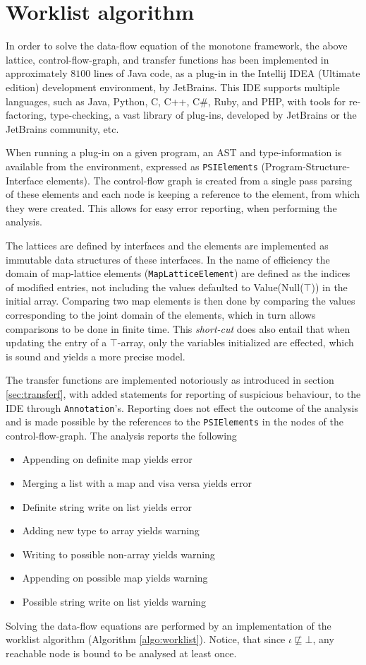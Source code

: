 \section{Worklist algorithm}
\label{sec:worklist}
In order to solve the data-flow equation of the monotone framework, the above lattice, control-flow-graph, and transfer functions has been implemented in approximately $8100$ lines of Java code, as a plug-in in the Intellij IDEA (Ultimate edition) development environment, by JetBrains. This IDE supports multiple languages, such as Java, Python, C, C++, C\#, Ruby, and PHP, with tools for re-factoring, type-checking, a vast library of plug-ins, developed by JetBrains or the JetBrains community, etc. 

When running a plug-in on a given program, an AST and type-information is available from the environment, expressed as \texttt{PSIElements} (Program-Structure-Interface elements).  The control-flow graph is created from a single pass parsing of these elements and each node is keeping a reference to the element, from which they were created. This allows for easy error reporting, when performing the analysis. 

The lattices are defined by interfaces and the elements are implemented as immutable data structures of these interfaces. In the name of efficiency the domain of map-lattice elements (\texttt{MapLatticeElement}) are defined as the indices of modified entries, not including the values defaulted to Value(Null($\top$)) in the initial array. Comparing two map elements is then done by comparing the values corresponding to the joint domain of the elements, which in turn allows comparisons to be done in finite time. This \emph{short-cut} does also entail that when updating the entry of a $\top$-array, only the variables initialized are effected, which is sound and yields a more precise model.

The transfer functions are implemented notoriously as introduced in section \ref{sec:transferf}, with added statements for reporting of suspicious behaviour, to the IDE through \texttt{Annotation}'s. Reporting does not effect the outcome of the analysis and is made possible by the references to the \texttt{PSIElements} in the nodes of the control-flow-graph. The analysis reports the following
\begin{itemize}
\item Appending on definite map yields error
\item Merging a list with a map and visa versa yields error
\item Definite string write on list yields error
\item Adding new type to array yields warning
\item Writing to possible non-array yields warning
\item Appending on possible map yields warning
\item Possible string write on list yields warning
\end{itemize}
Solving the data-flow equations are performed by an implementation of the worklist algorithm (Algorithm \ref{algo:worklist}). Notice, that since $\iota \not\sqsubseteq \bot$, any reachable node is bound to be analysed at least once. 

